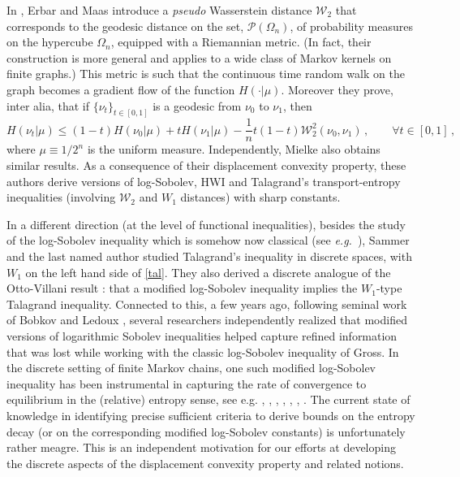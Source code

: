\documentclass[11pt]{amsart}
\numberwithin{equation}{section}
\begin{document}
In \cite{erbar-maas}, Erbar and Maas introduce a {\em pseudo} Wasserstein distance $\mathcal{W}_2$ that corresponds to the geodesic distance on the set, $\mathcal{P}(\Omega_n)$, of probability measures on the hypercube $\Omega_n$,  equipped with a Riemannian metric. (In fact, their construction is more general and applies to a wide class of Markov kernels on finite graphs.) This metric is such that the continuous time random walk on the graph becomes a gradient flow of the function $H(\cdot|\mu)$. Moreover they prove, inter alia,  that if $\{\nu_t\}_{t\in [0,1]}$ is a geodesic from $\nu_0$ to $\nu_1$, then
$$
H(\nu_t|\mu) \leq (1-t) H(\nu_0|\mu) + t H(\nu_1|\mu) - \frac{1}{n}t(1-t) \mathcal{W}_2^2(\nu_0,\nu_1) \,,
\qquad \forall t\in[0,1] \,,
$$ 
where $\mu\equiv 1/2^n$ is the uniform measure. Independently, Mielke \cite{mielke} also obtains  similar results.
As a consequence of their displacement convexity property, these authors derive versions of log-Sobolev, HWI and Talagrand's transport-entropy inequalities (involving $\mathcal{W}_2$ and $W_1$ distances) with sharp constants.

In a different direction (at the level of functional inequalities), besides the study of the log-Sobolev inequality which is somehow now classical (see \textit{e.g.}\ \cite{Saloff,ane}),  Sammer and the last named author \cite{sammer-thesis,sammer-tetali} studied Talagrand's inequality in discrete spaces, with $W_1$ on the left hand side of \eqref{tal}. They also derived a discrete analogue of the Otto-Villani result \cite{OV00}: that
a modified log-Sobolev inequality implies the  $W_1$-type Talagrand inequality. 
Connected to this, a few years ago, 
following seminal work of Bobkov and Ledoux \cite{bobkov-ledoux-98}, several researchers
independently realized that modified versions of logarithmic Sobolev inequalities helped capture
refined information that was lost while working with the classic log-Sobolev inequality of 
Gross. In the discrete setting of finite Markov chains, one such modified log-Sobolev inequality
has been instrumental in capturing the rate of convergence to equilibrium in the (relative)
entropy sense, see e.g. \cite{PPP}, \cite{DPPP}, \cite{bobkov-tetali}, \cite{GQ03}, \cite{goel}, \cite{Saloff}, \cite{roberto-thesis}. 
The current state of knowledge in identifying precise sufficient criteria to derive bounds on the
entropy decay (or on the corresponding modified log-Sobolev constants) is unfortunately rather meagre. 
This is an independent motivation for our efforts  at
developing the discrete aspects of the displacement convexity property and related notions.
\end{document}
